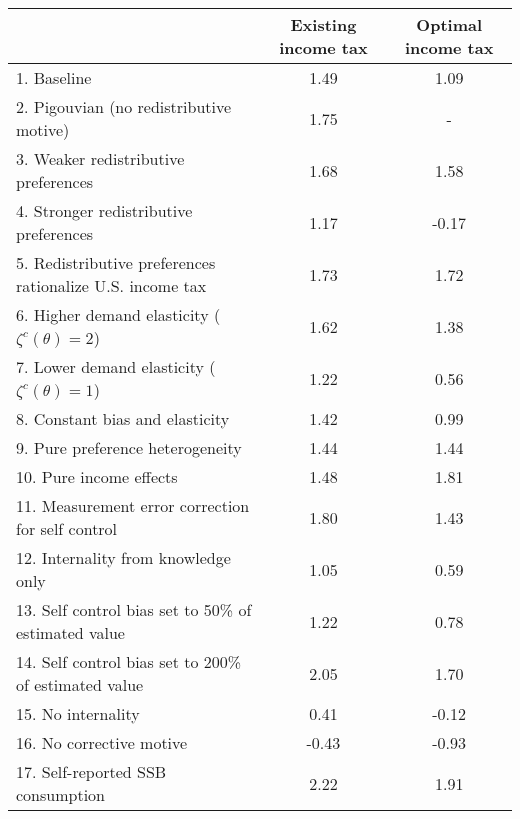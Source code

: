 \begin{tabular}{lcc}
\hline
\hline
 & Existing income tax & Optimal income tax \\
\hline
1. Baseline & 1.49 & 1.09 \\
2. Pigouvian (no redistributive motive) & 1.75 & - \\
3. Weaker redistributive preferences & 1.68 & 1.58 \\
4. Stronger redistributive preferences & 1.17 & -0.17 \\
5. Redistributive preferences rationalize U.S. income tax & 1.73 & 1.72 \\
6. Higher demand elasticity ($\zeta^c(\theta) = 2$) & 1.62 & 1.38 \\
7. Lower demand elasticity ($\zeta^c(\theta) = 1$) & 1.22 & 0.56 \\
8. Constant bias and elasticity & 1.42 & 0.99 \\
9. Pure preference heterogeneity & 1.44 & 1.44 \\
10. Pure income effects & 1.48 & 1.81 \\
11. Measurement error correction for self control & 1.80 & 1.43 \\
12. Internality from knowledge only & 1.05 & 0.59 \\
13. Self control bias set to 50\% of estimated value & 1.22 & 0.78 \\
14. Self control bias set to 200\% of estimated value & 2.05 & 1.70 \\
15. No internality & 0.41 & -0.12 \\
16. No corrective motive & -0.43 & -0.93 \\
17. Self-reported SSB consumption & 2.22 & 1.91 \\
\hline
\hline
\end{tabular}
